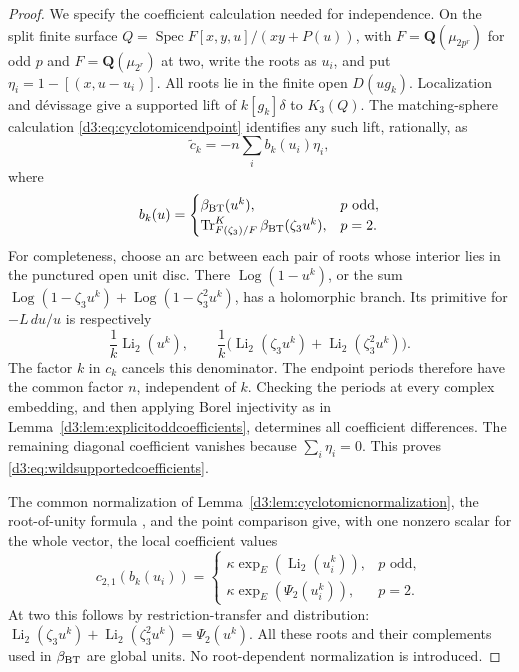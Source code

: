 \documentclass[11pt,a4paper]{amsart}
\numberwithin{equation}{section}
\theoremstyle{definition}
\theoremstyle{remark}
\newcommand{\Q}{\mathbf Q}
\newcommand{\Spec}{\operatorname{Spec}}
\begin{document}
\begin{proof}
We specify the coefficient calculation needed for independence.
On the split finite surface
$Q=\Spec F[x,y,u]/(xy+P(u))$, with $F=\Q(\mu_{2p^r})$ for
odd $p$ and $F=\Q(\mu_{2^r})$ at two, write the roots as $u_i$,
and put $\eta_i=1-[(x,u-u_i)]$.
All roots lie in the finite open $D(ug_k)$.
Localization and d\'evissage give a supported lift of
$k[g_k]\delta$ to $K_3(Q)$.
The matching-sphere calculation \eqref{d3:eq:cyclotomicendpoint}
identifies any such lift, rationally, as
\begin{equation}\label{d3:eq:wildsupportedcoefficients}
 \widetilde c_k=-n\sum_i b_k(u_i)\eta_i,
\end{equation}
where
\[
 b_k(u)=
 \begin{cases}
 \beta_{\rm BT}(u^k),&p\text{ odd},\\
 \operatorname{Tr}^{K}_{F(\zeta_3)/F}
       \beta_{\rm BT}(\zeta_3u^k),&p=2.
 \end{cases}
\]
For completeness, choose an arc between each pair of roots whose
interior lies in the punctured open unit disc. There
$\operatorname{Log}(1-u^k)$, or the sum
$\operatorname{Log}(1-\zeta_3u^k)+
 \operatorname{Log}(1-\zeta_3^2u^k)$, has a holomorphic branch.
Its primitive for $-L\,du/u$ is respectively
\[
 \frac1k\operatorname{Li}_2(u^k),\qquad
 \frac1k\bigl(\operatorname{Li}_2(\zeta_3u^k)
                  +\operatorname{Li}_2(\zeta_3^2u^k)\bigr).
\]
The factor $k$ in $c_k$ cancels this denominator.
The endpoint periods therefore have the common factor $n$,
independent of $k$. Checking the periods at every complex embedding,
and then applying Borel injectivity as in
Lemma~\ref{d3:lem:explicitoddcoefficients}, determines all coefficient
differences. The remaining diagonal coefficient vanishes because
$\sum_i\eta_i=0$. This proves
\eqref{d3:eq:wildsupportedcoefficients}.

The common normalization of
Lemma~\ref{d3:lem:cyclotomicnormalization}, the root-of-unity formula
\cite[Theorem~1.12]{BesserDeJeu}, and the point comparison give,
with one nonzero scalar for the whole vector, the local coefficient
values
\[
 c_{2,1}(b_k(u_i))=
 \begin{cases}
 \kappa\exp_E(\operatorname{Li}_2(u_i^k)),&p\text{ odd},\\
 \kappa\exp_E(\Psi_2(u_i^k)),&p=2.
 \end{cases}
\]
At two this follows by restriction-transfer and distribution:
$\operatorname{Li}_2(\zeta_3u^k)+
\operatorname{Li}_2(\zeta_3^2u^k)=\Psi_2(u^k)$.
All these roots and their complements used in $\beta_{\rm BT}$
are global units. No root-dependent normalization is introduced.


\end{proof}
\end{document}
